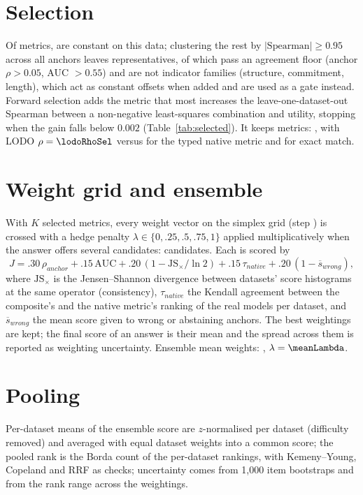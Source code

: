 \documentclass[10pt,twocolumn]{article}
\begin{document}
\section{Selection}\label{sec:select}
Of \nMetrics{} metrics, \nConstant{} are constant on this data; clustering the rest by $|\text{Spearman}|\ge 0.95$ across all anchors leaves \nReps{} representatives, of which \nCands{} pass an agreement floor (anchor $\rho>0.05$, AUC $>0.55$) and are not indicator families (structure, commitment, length), which act as constant offsets when added and are used as a gate instead. Forward selection adds the metric that most increases the leave-one-dataset-out Spearman between a non-negative least-squares combination and utility, stopping when the gain falls below $0.002$ (Table~\ref{tab:selected}). It keeps \kSel{} metrics: \selList{}, with LODO $\rho=\lodoRhoSel$ versus \lodoRhoNative{} for the typed native metric and \lodoRhoEm{} for exact match.

\section{Weight grid and ensemble}\label{sec:grid}
With $K$ selected metrics, every weight vector on the simplex grid (step \gridStep) is crossed with a hedge penalty $\lambda\in\{0,.25,.5,.75,1\}$ applied multiplicatively when the answer offers several candidates: \nGrid{} candidates. Each is scored by
\[J = .30\,\rho_{anchor} + .15\,\mathrm{AUC} + .20\,(1-\mathrm{JS}_\times/\ln 2) + .15\,\tau_{native} + .20\,(1-\overline{s}_{wrong}),\]
where $\mathrm{JS}_\times$ is the Jensen--Shannon divergence between datasets' score histograms at the same operator (consistency), $\tau_{native}$ the Kendall agreement between the composite's and the native metric's ranking of the real models per dataset, and $\overline{s}_{wrong}$ the mean score given to wrong or abstaining anchors. The \topK{} best weightings are kept; the final score of an answer is their mean and the spread across them is reported as weighting uncertainty. Ensemble mean weights: \meanW{}, $\lambda=\meanLambda$.

\section{Pooling}\label{sec:pool}
Per-dataset means of the ensemble score are $z$-normalised per dataset (difficulty removed) and averaged with equal dataset weights into a common score; the pooled rank is the Borda count of the per-dataset rankings, with Kemeny--Young, Copeland and RRF as checks; uncertainty comes from 1{,}000 item bootstraps and from the rank range across the \topK{} weightings.
\end{document}
